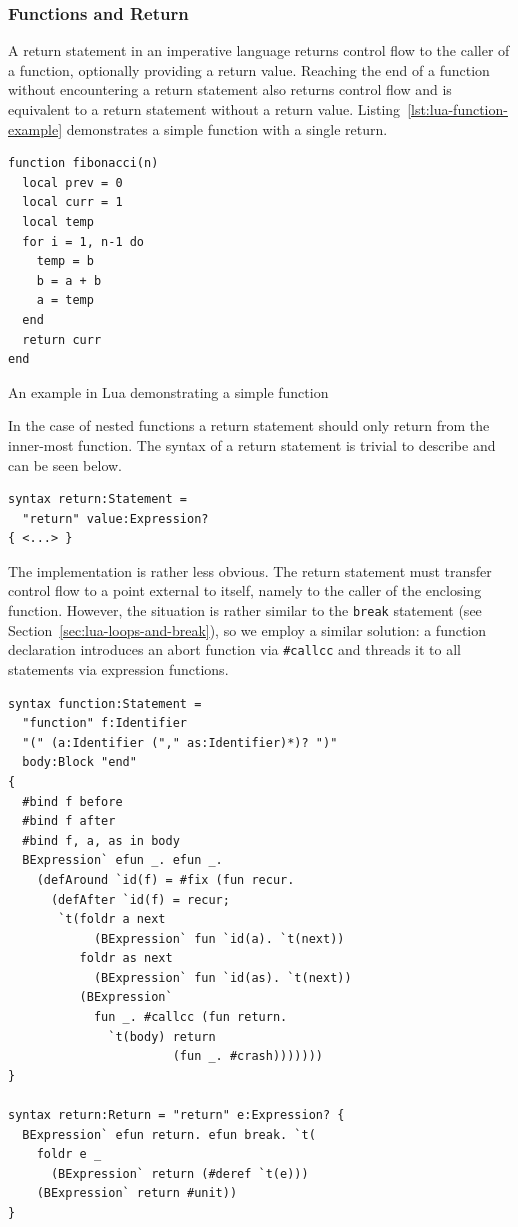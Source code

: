 \documentclass{kththesis}
\begin{document}
\subsubsection{Functions and Return}

A return statement in an imperative language returns control flow to the caller of a function, optionally providing a return value. Reaching the end of a function without encountering a return statement also returns control flow and is equivalent to a return statement without a return value. Listing~\ref{lst:lua-function-example} demonstrates a simple function with a single return.

\begin{listing}
\begin{verbatim}
function fibonacci(n)
  local prev = 0
  local curr = 1
  local temp
  for i = 1, n-1 do
    temp = b
    b = a + b
    a = temp
  end
  return curr
end
\end{verbatim}
\caption{An example in Lua demonstrating a simple function}
\label{lst:lua-function-example}
\end{listing}

In the case of nested functions a return statement should only return from the inner-most function. The syntax of a return statement is trivial to describe and can be seen below.

\begin{verbatim}
syntax return:Statement =
  "return" value:Expression?
{ <...> }
\end{verbatim}

The implementation is rather less obvious. The return statement must transfer control flow to a point external to itself, namely to the caller of the enclosing function. However, the situation is rather similar to the \texttt{break} statement (see Section~\ref{sec:lua-loops-and-break}), so we employ a similar solution: a function declaration introduces an abort function via \texttt{#callcc} and threads it to all statements via expression functions.

\begin{verbatim}
syntax function:Statement =
  "function" f:Identifier
  "(" (a:Identifier ("," as:Identifier)*)? ")"
  body:Block "end"
{
  #bind f before
  #bind f after
  #bind f, a, as in body
  BExpression` efun _. efun _.
    (defAround `id(f) = #fix (fun recur.
      (defAfter `id(f) = recur;
       `t(foldr a next
            (BExpression` fun `id(a). `t(next))
          foldr as next
            (BExpression` fun `id(as). `t(next))
          (BExpression`
            fun _. #callcc (fun return.
              `t(body) return
                       (fun _. #crash)))))))
}

syntax return:Return = "return" e:Expression? {
  BExpression` efun return. efun break. `t(
    foldr e _
      (BExpression` return (#deref `t(e)))
    (BExpression` return #unit))
}
\end{verbatim}
\end{document}
